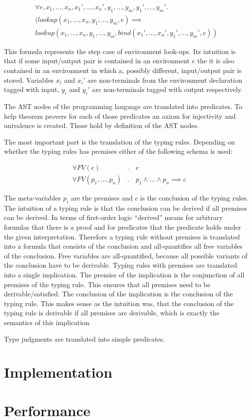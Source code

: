 \begin{multline}
  \forall e, x_1, \dots, x_n, x_1', \dots, x_n', y_1, \dots, y_m, y_1', \dots,
  y_m' . \\
  (lookup(x_1, \dots, x_n, y_1, \dots, y_m, e) \implies \\ lookup(x_1,
  \dots, x_n, y_1, \dots, y_m, bind(x_1',\dots,x_n',y_1',\dots,y_m',e))
\end{multline}

This formula represents the step case of environment look-ups. Its
intuition is that if some input/output pair is contained in an
environment $e$ the it is also contained in an environment in which a,
possibly different, input/output pair is stored. Variables $x_i$ and
$x_i'$ are non-terminals from the environment declaration tagged with
input, $y_i$ and $y_i'$ are non-terminals tagged with output
respectively.

The AST nodes of the programming language are translated into
predicates. To help theorem provers for each of those predicates an
axiom for injectivity and univalence is created. Those hold by
definition of the AST nodes.

The most important part is the translation of the typing
rules. Depending on whether the typing rules has premises either of
the following schema is used:

\begin{align}
  &\forall FV(c) &.\,& c \\
  &\forall FV(p_1,\dots, p_n) &.\,& p_1 \land \dots \land p_n \implies c
\end{align}

The meta-variables $p_i$ are the premises and $c$ is the conclusion of
the typing rules. The intuition of a typing rule is that the
conclusion can be derived if all premises can be derived. In terms of
first-order logic ``derived'' means for arbitrary formulas that there
is a proof and for predicates that the predicate holds under the given
interpretation. Therefore a typing rule without premises is translated
into a formula that consists of the conclusion and all-quantifies all
free variables of the conclusion. Free variables are all-quantified,
because all possible variants of the conclusion have to be derivable.
Typing rules with premises are translated into a single
implication. The premise of the implication is the conjunction of all
premises of the typing rule. This ensures that all premises need to be
derivable/satisfied. The conclusion of the implication is the
conclusion of the typing rule. This makes sense as the intuition was,
that the conclusion of the typing rule is derivable if all premises
are derivable, which is exactly the semantics of this implication.

Type judgments are translated into simple predicates.
\section{Implementation}
\section{Performance}
